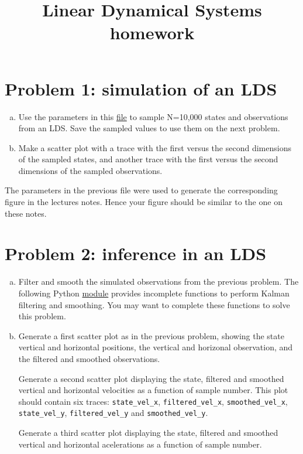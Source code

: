 \documentclass{article}
\title{Linear Dynamical Systems homework}
\author{}
\date{}
\begin{document}
\maketitle

\section*{Problem 1: simulation of an LDS}

\begin{enumerate}[(a)]

    \item Use the parameters in this
        \href{https://github.com/joacorapela/probabilisticModelingCourse/blob/master/lds/data/00000002_simulation_params.npz}{file}
        to sample N=10,000 states and observations from an LDS. Save the
        sampled values to use them on the next problem.

    \item Make a scatter plot with a trace with the first versus the second
        dimensions of the sampled states, and another trace with the first
        versus the second dimensions of the sampled observations.

\end{enumerate}

The parameters in the previous file were used to generate the corresponding
figure in the lectures notes. Hence your figure should be similar to the one on
these notes.

\section*{Problem 2: inference in an LDS}

\begin{enumerate}[(a)]

    \item Filter and smooth the simulated observations from the previous
        problem. The following Python
        \href{https://github.com/joacorapela/probabilisticModelingCourse/blob/master/lds/code/src/inference.py}{module}
        provides incomplete functions to perform Kalman filtering and
        smoothing. You may want to complete these functions to solve this
        problem.

    \item Generate a first scatter plot as in the previous problem, showing the
        state vertical and horizontal positions, the vertical and horizonal
        observation, and the filtered and smoothed observations.

        Generate a second scatter plot displaying the state, filtered and
        smoothed vertical and horizontal velocities as a function of sample
        number. This plot should contain six traces: \texttt{state\_vel\_x},
        \texttt{filtered\_vel\_x}, \texttt{smoothed\_vel\_x},
        \texttt{state\_vel\_y}, \texttt{filtered\_vel\_y} and
        \texttt{smoothed\_vel\_y}.

        Generate a third scatter plot displaying the state, filtered and
        smoothed vertical and horizontal acelerations as a function of sample
        number.

\end{enumerate}
\end{document}
